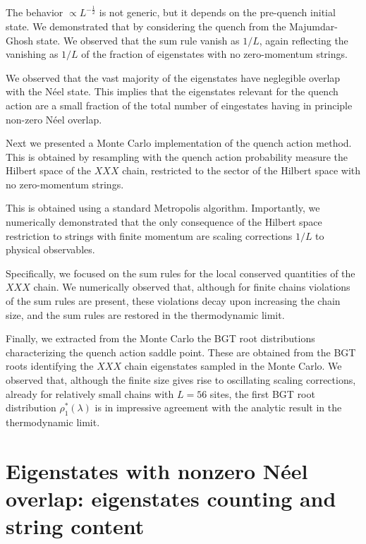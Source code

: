 \documentclass[11pt]{iopart}
\begin{document}
The behavior $\propto L^{-\frac{1}{2}}$ is not generic, but it depends on the 
pre-quench initial state. We demonstrated that by considering the quench from 
the Majumdar-Ghosh state. We observed that the sum rule vanish as $1/L$, again 
reflecting the vanishing as $1/L$ of the fraction of eigenstates with no 
zero-momentum strings. 

We observed that the vast majority of the eigenstates have neglegible overlap 
with the N\'eel state. This implies that the eigenstates relevant for the 
quench action are a small fraction of the total number of eingestates having 
in principle non-zero N\'eel overlap. 

Next we presented a Monte Carlo implementation of the quench action method. 
This is obtained by resampling with the quench action probability measure 
the Hilbert space of the $XXX$ chain, restricted to the sector of the  Hilbert 
space with no zero-momentum strings. 

This is obtained using a standard Metropolis algorithm. Importantly, we 
numerically demonstrated that the only consequence of the Hilbert space 
restriction to strings with finite momentum are scaling corrections $1/L$ 
to physical observables. 

Specifically, we focused on the sum rules for the local conserved quantities 
of the $XXX$ chain. We numerically observed that, although for finite chains 
violations of the sum rules are present, these violations decay upon increasing 
the chain size, and the sum rules are restored in the thermodynamic limit. 

Finally, we extracted from the Monte Carlo the BGT root distributions characterizing 
the quench action saddle point. These are obtained from the BGT roots identifying 
the $XXX$ chain eigenstates sampled in the Monte Carlo. We observed that, although 
the finite size gives rise to oscillating scaling corrections, already for 
relatively small chains with $L=56$ sites, the first BGT root distribution 
$\rho^*_1(\lambda)$ is in impressive agreement with the analytic result in 
the thermodynamic limit. 



\appendix

\section{Eigenstates with nonzero N\'eel overlap: eigenstates counting and 
string content}
\label{app-1}
\end{document}

